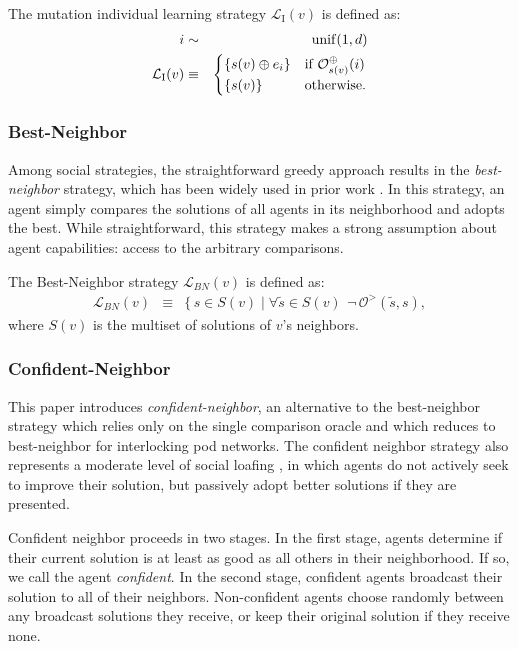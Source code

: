 \begin{definition}
The mutation individual learning strategy $\mathcal{L}_{\text{I}}(v)$ is defined as:
\begin{eqnarray}
i &\sim& \operatorname{unif}(1,d) \nonumber\\
\mathcal{L}_{\text{I}}(v) &\equiv&
\begin{cases}
\{s(v) \oplus e_i\} & \mbox{if $\mathcal{O}^{\oplus}_{s(v)}(i)$}
\\
\{s(v)\} & \mbox{otherwise}.
\end{cases}
\end{eqnarray}
\end{definition}

\subsubsection{Best-Neighbor}
Among social strategies, the straightforward greedy approach results in the {\em best-neighbor} strategy, which has been widely used in prior work \cite{lazer_network_2007, mason_propagation_2008, barkoczi_social_2016}. In this strategy, an agent simply compares the solutions of all agents in its neighborhood and adopts the best. While straightforward, this strategy makes a strong assumption about agent capabilities: access to the arbitrary comparisons.
\begin{definition}
The Best-Neighbor strategy $\mathcal{L}_{BN}(v)$ is defined as:
\begin{eqnarray}
\mathcal{L}_{BN}(v)
&\equiv&
\{ \, s \!\in\! S(v)
\mid
\forall \tilde{s} \!\in\! S(v) \, \
\lnot \, \mathcal{O}^{>}(\tilde{s}, s),
\end{eqnarray}
where $S(v)$ is the multiset of solutions of $v$'s neighbors.
\end{definition}

\subsubsection{Confident-Neighbor}
This paper introduces {\em confident-neighbor}, an alternative to the best-neighbor strategy which relies only on the single comparison oracle and which reduces to best-neighbor for interlocking pod networks. The confident neighbor strategy also represents a moderate level of social loafing \cite{karau_social_1993}, in which agents do not actively seek to improve their solution, but passively adopt better solutions if they are presented.

Confident neighbor proceeds in two stages. In the first stage, agents determine if their current solution is at least as good as all others in their neighborhood. If so, we call the agent {\em confident}. In the second stage, confident agents broadcast their solution to all of their neighbors. Non-confident agents choose randomly between any broadcast solutions they receive, or keep their original solution if they receive none.

